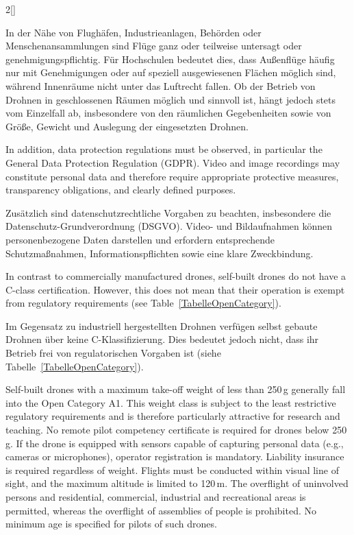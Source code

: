 \begin{paracol}{2}[]
\colger

In der Nähe von Flughäfen, Industrieanlagen, Behörden oder Menschenansammlungen sind Flüge ganz oder teilweise untersagt oder genehmigungspflichtig. Für Hochschulen bedeutet dies, dass Außenflüge häufig nur mit Genehmigungen oder auf speziell ausgewiesenen Flächen möglich sind, während Innenräume nicht unter das Luftrecht fallen. Ob der Betrieb von Drohnen in geschlossenen Räumen möglich und sinnvoll ist, hängt jedoch stets vom Einzelfall ab, insbesondere von den räumlichen Gegebenheiten sowie von Größe, Gewicht und Auslegung der eingesetzten Drohnen.

\coleng

In addition, data protection regulations must be observed, in particular the General Data Protection Regulation (GDPR). Video and image recordings may constitute personal data and therefore require appropriate protective measures, transparency obligations, and clearly defined purposes.

\colger

Zusätzlich sind datenschutzrechtliche Vorgaben zu beachten, insbesondere die Datenschutz-Grundverordnung (DSGVO). Video- und Bildaufnahmen können personenbezogene Daten darstellen und erfordern entsprechende Schutzmaßnahmen, Informationspflichten sowie eine klare Zweckbindung.

\colende

\renewcommand{\deutschertitel}{Selbst gebaute Drohnen}
\renewcommand{\englischertitel}{Self-build Drones}
\makrounterabschnitt
\label{AbschnittSelbstgebauteDrohnen}

In contrast to commercially manufactured drones, self-built drones do not have a C-class certification. However, this does not mean that their operation is exempt from regulatory requirements (see Table~\ref{TabelleOpenCategory}).

\colger

Im Gegensatz zu industriell hergestellten Drohnen verfügen selbst gebaute Drohnen über keine C-Klassifizierung. Dies bedeutet jedoch nicht, dass ihr Betrieb frei von regulatorischen Vorgaben ist (siehe Tabelle~\ref{TabelleOpenCategory}).

\coleng

Self-built drones with a maximum take-off weight of less than 250\,g generally fall into the Open Category A1. This weight class is subject to the least restrictive regulatory requirements and is therefore particularly attractive for research and teaching. No remote pilot competency certificate is required for drones below 250\,g. If the drone is equipped with sensors capable of capturing personal data (e.g., cameras or microphones), operator registration is mandatory. Liability insurance is required regardless of weight. Flights must be conducted within visual line of sight, and the maximum altitude is limited to 120\,m. The overflight of uninvolved persons and residential, commercial, industrial and recreational areas is permitted, whereas the overflight of assemblies of people is prohibited. No minimum age is specified for pilots of such drones.


\end{paracol}
